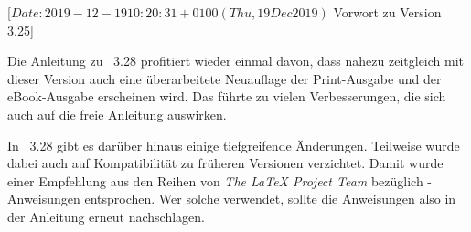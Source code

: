 %
%
%
%
%
%
%
%
%

                 [$Date: 2019-12-19 10:20:31 +0100 (Thu, 19 Dec 2019) $
                  Vorwort zu Version 3.25]


Die Anleitung zu \KOMAScript~3.28 profitiert wieder einmal davon, dass nahezu
zeitgleich mit dieser Version auch eine überarbeitete Neuauflage der
Print-Ausgabe \cite{book:komascript} und der eBook-Ausgabe
\cite{ebook:komascript} erscheinen wird. Das führte zu vielen Verbesserungen,
die sich auch auf die freie Anleitung auswirken.

In \KOMAScript~3.28 gibt es darüber hinaus einige tiefgreifende
Änderungen. Teilweise wurde dabei auch auf Kompatibilität zu früheren
Versionen verzichtet. Damit wurde einer Empfehlung aus den Reihen von
\emph{The \LaTeX{} Project Team} bezüglich -Anweisungen
entsprochen. Wer solche verwendet, sollte die Anweisungen also in der
Anleitung erneut nachschlagen.

